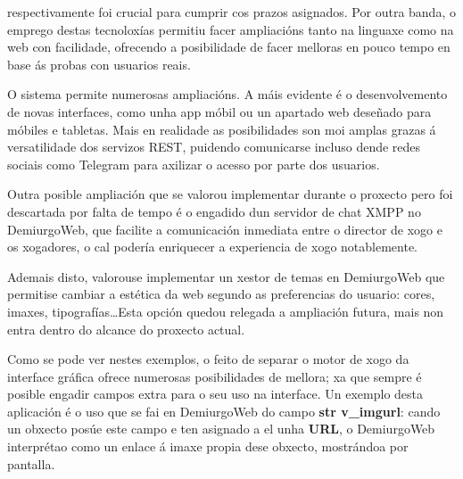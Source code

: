 respectivamente foi crucial para cumprir cos prazos asignados. Por outra banda,
o emprego destas tecnoloxías permitiu facer ampliacións tanto na linguaxe como
na web con facilidade, ofrecendo a posibilidade de facer melloras en pouco tempo
en base ás probas con usuarios reais.
\par
O sistema permite numerosas ampliacións. A máis evidente é o desenvolvemento de
novas interfaces, como unha app móbil ou un apartado web deseñado para móbiles e
tabletas. Mais en realidade as posibilidades son moi amplas grazas á
versatilidade dos servizos REST, puidendo comunicarse incluso dende redes
sociais como Telegram para axilizar o acesso por parte dos usuarios.
\par
Outra posible ampliación que se valorou implementar durante o proxecto pero foi
descartada por falta de tempo é o engadido dun servidor de chat XMPP no
DemiurgoWeb, que facilite a comunicación inmediata entre o director de xogo e os
xogadores, o cal podería enriquecer a experiencia de xogo notablemente.
\par
Ademais disto, valorouse implementar un xestor de temas en DemiurgoWeb que
permitise cambiar a estética da web segundo as preferencias do usuario: cores,
imaxes, tipografías\ldots Esta opción quedou relegada a ampliación futura, mais
non entra dentro do alcance do proxecto actual.
\par
Como se pode ver nestes exemplos, o feito de separar o motor de xogo da
interface gráfica ofrece numerosas posibilidades de mellora; xa que sempre é
posible engadir campos extra para o seu uso na interface. Un exemplo desta
aplicación é o uso que se fai en DemiurgoWeb do campo \textbf{str v\_imgurl}:
cando un obxecto posúe este campo e ten asignado a el unha \textbf{URL}, o
DemiurgoWeb interprétao como un enlace á imaxe propia dese obxecto, mostrándoa
por pantalla.
